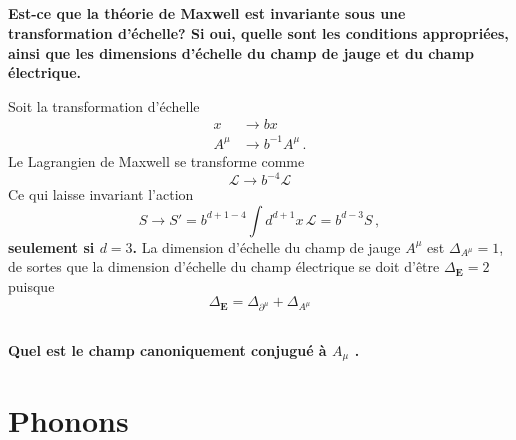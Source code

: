 \documentclass{article}
\numberwithin{equation}{section}
\theoremstyle{solution}
\begin{document}


\subsection{}
\textbf{Est-ce que la théorie de Maxwell est invariante sous une transformation d’échelle? Si
oui, quelle sont les conditions appropriées, ainsi que les dimensions d’échelle du champ de jauge
et du champ électrique.}
\vspace{2ex}

Soit la transformation d'échelle
\begin{equation}
\begin{split}
        x &\rightarrow  bx \\
        A^{\mu} &\rightarrow b^{-1}A^{\mu}\,. 
\end{split}
\end{equation} 
Le Lagrangien de Maxwell se transforme comme
\begin{equation}
        \mathcal{L} \rightarrow b^{-4}\mathcal{L}
\end{equation} 
Ce qui laisse invariant l'action
\begin{equation}
        S \rightarrow S' =  b^{d+1 - 4}\int d^{d+1}x \,\mathcal{L} = b^{d-3}S\, ,
\end{equation} 
\textbf{seulement si $\boxed{d=3}$.} La dimension d'échelle du champ de jauge $A^{\mu}$ est $\boxed{\Delta_{A^{\mu}} = 1}$, de sortes que la 
dimension d'échelle du champ électrique se doit d'être $\boxed{\Delta_{\mathbf{E}} = 2}$ puisque
\begin{equation}
        \Delta_{\mathbf{E}} = \Delta_{\partial^{\mu}} + \Delta_{A^{\mu}}
\end{equation} 



\subsection{}
\textbf{Quel est le champ canoniquement conjugué à $A_\mu$ . 
\vspace{2ex}
}

\section{Phonons}
\subsection{}
\end{document}
